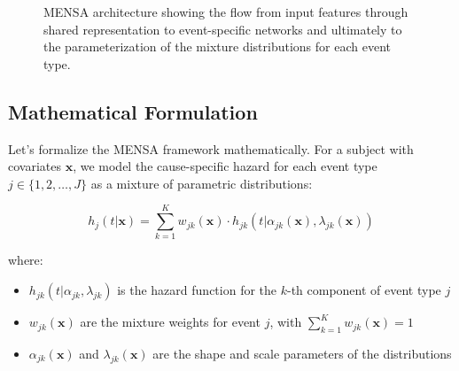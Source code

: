\begin{figure}[htbp]
    \caption{MENSA architecture showing the flow from input features through shared representation to event-specific networks and ultimately to the parameterization of the mixture distributions for each event type.}
    \label{fig:mensa-architecture}
\end{figure}

\subsection{Mathematical Formulation}

Let's formalize the MENSA framework mathematically. For a subject with covariates $\mathbf{x}$, we model the cause-specific hazard for each event type $j \in \{1, 2, \ldots, J\}$ as a mixture of parametric distributions:

\begin{equationbox}[title=MENSA Cause-Specific Hazard]
\begin{equation}
h_j(t|\mathbf{x}) = \sum_{k=1}^{K} w_{jk}(\mathbf{x}) \cdot h_{jk}(t|\alpha_{jk}(\mathbf{x}), \lambda_{jk}(\mathbf{x}))
\end{equation}

where:
\begin{itemize}
    \item $h_{jk}(t|\alpha_{jk}, \lambda_{jk})$ is the hazard function for the $k$-th component of event type $j$
    \item $w_{jk}(\mathbf{x})$ are the mixture weights for event $j$, with $\sum_{k=1}^{K} w_{jk}(\mathbf{x}) = 1$
    \item $\alpha_{jk}(\mathbf{x})$ and $\lambda_{jk}(\mathbf{x})$ are the shape and scale parameters of the distributions
\end{itemize}
\end{equationbox}

